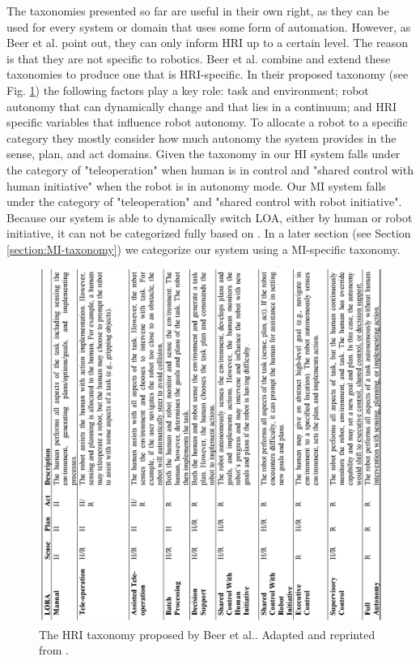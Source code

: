 \documentclass[a4paper,12pt,oneside,openright]{bhamthesis}
\begin{document}
The taxonomies presented so far are useful in their own right, as they can be used for every system or domain that uses some form of automation. However, as Beer et al.\citep{Beer2014} point out, they can only inform HRI up to a certain level. The reason is that they are not specific to robotics. Beer et al. \citep{Beer2014} combine and extend these taxonomies to produce one that is HRI-specific. In their proposed taxonomy \citep{Beer2014} (see Fig. \ref{fig:HRItaxonomy}) the following factors play a key role: task and environment; robot autonomy that can dynamically change and that lies in a continuum; and HRI specific variables that influence robot autonomy. To allocate a robot to a specific category they mostly consider how much autonomy the system provides in the sense, plan, and act domains. Given the taxonomy in \citep{Beer2014} our HI system falls under the category of "teleoperation" when human is in control and "shared control with human initiative" when the robot is in autonomy mode. Our MI system falls under the category of "teleoperation" and "shared control with robot initiative". Because our system is able to dynamically switch LOA, either by human or robot initiative, it can not be categorized fully based on \citep{Beer2014}. In a later section (see Section \ref{section:MI-taxonomy}) we categorize our system using a MI-specific taxonomy.

\begin{figure}
	\centering
	\includegraphics[width=1\columnwidth]{BeerHRItaxonomy.png}
	\caption{The HRI taxonomy proposed by Beer et al.\citep{Beer2014}. Adapted and reprinted from \citep{Beer2014}.} 
	\label{fig:HRItaxonomy}
\end{figure}
\end{document}
